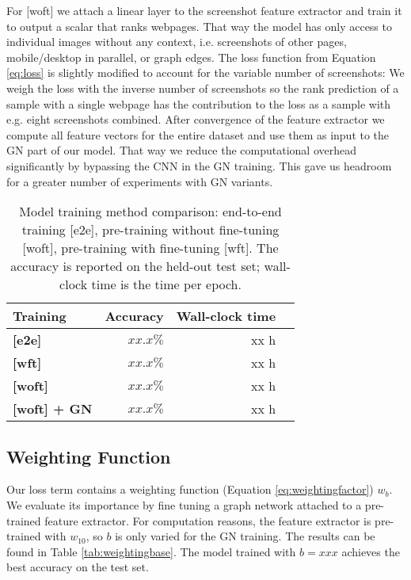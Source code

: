 For [woft] we attach a linear layer to the screenshot feature extractor and train it to output a scalar that ranks webpages. That way the model has only access to individual images without any context, i.e. screenshots of other pages, mobile/desktop in parallel, or graph edges. The loss function from Equation \ref{eq:loss} is slightly modified to account for the variable number of screenshots: We weigh the loss with the inverse number of screenshots so the rank prediction of a sample with a single webpage has the contribution to the loss as a sample with e.g. eight screenshots combined. After convergence of the feature extractor we compute all feature vectors for the entire dataset and use them as input to the GN part of our model. That way we reduce the computational overhead significantly by bypassing the CNN in the GN training. This gave us headroom for a greater number of experiments with GN variants.

\begin{table}
    \centering
    \begin{tabular}{lrrr}
        \textbf{Training} & \textbf{Accuracy} & \textbf{Wall-clock time}\\\hline
        \textbf{[e2e]} & $xx.x\%$ & xx h\\
        \textbf{[wft]} & $xx.x\%$ & xx h\\
        \textbf{[woft]} & $xx.x\%$ & xx h\\
        \textbf{[woft] + GN} & $xx.x\%$ & xx h\\
    \end{tabular}
    \caption[Model training method comparison]{Model training method comparison: end-to-end training [e2e], pre-training without fine-tuning [woft], pre-training with fine-tuning [wft]. The accuracy is reported on the held-out test set; wall-clock time is the time per epoch.}
    \label{tab:trainmethodcomparison}
\end{table}

\subsection{Weighting Function}

Our loss term contains a weighting function (Equation \ref{eq:weightingfactor}) $w_b$. We evaluate its importance by fine tuning a graph network attached to a pre-trained feature extractor. For computation reasons, the feature extractor is pre-trained with $w_{10}$, so $b$ is only varied for the GN training. The results can be found in Table \ref{tab:weightingbase}. The model trained with $b=xxx$ achieves the best accuracy on the test set.

